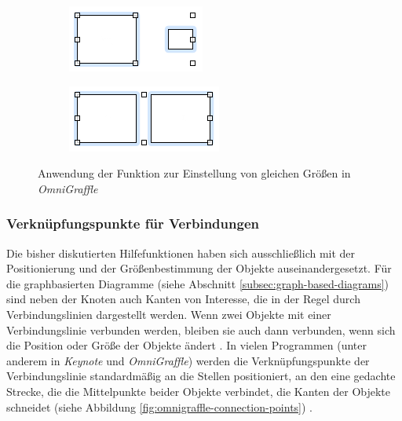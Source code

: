 \begin{figure}[hbt]
    \newcommand{\subfigurewidth}{0.5\textwidth}
    \begin{subfigure}{\subfigurewidth}
        \centering
        \includegraphics{resources/omnigraffle-make-same-size-a}
        \caption{}
        \label{fig:omnigraffle-make-same-size-a}
    \end{subfigure}
    \begin{subfigure}{\subfigurewidth}
        \centering
        \includegraphics{resources/omnigraffle-make-same-size-b}
        \caption{}
        \label{fig:omnigraffle-make-same-size-b}
    \end{subfigure}
    \caption{Anwendung der Funktion zur Einstellung von gleichen Größen in \textit{OmniGraffle}}
    \label{fig:omnigraffle-make-same-size}
\end{figure}

\subsubsection{Verknüpfungspunkte für Verbindungen}
\label{subsubsec:connection-points}

Die bisher diskutierten Hilfefunktionen haben sich ausschließlich mit der Positionierung und der Größenbestimmung der Objekte auseinandergesetzt. Für die graphbasierten Diagramme (siehe Abschnitt \ref{subsec:graph-based-diagrams}) sind neben der Knoten auch Kanten von Interesse, die in der Regel durch Verbindungslinien dargestellt werden. Wenn zwei Objekte mit einer Verbindungslinie verbunden werden, bleiben sie auch dann verbunden, wenn sich die Position oder Größe der Objekte ändert \cite{11Keynote}. In vielen Programmen (unter anderem in \textit{Keynote} und \textit{OmniGraffle}) werden die Verknüpfungspunkte der Verbindungslinie standardmäßig an die Stellen positioniert, an den eine gedachte Strecke, die die Mittelpunkte beider Objekte verbindet, die Kanten der Objekte schneidet (siehe Abbildung \ref{fig:omnigraffle-connection-points}) \cite{08OmniGraffle}.

